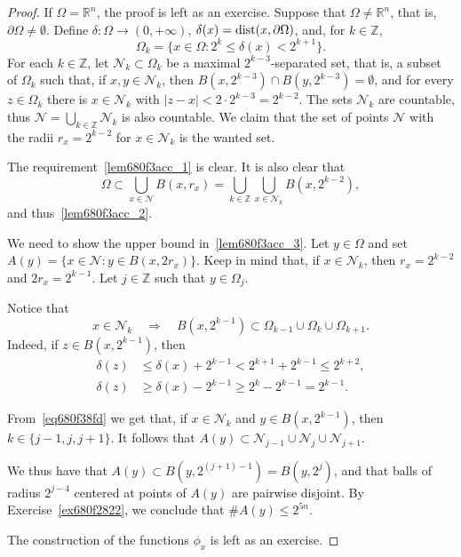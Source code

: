 \documentclass[a4paper,9pt]{amsart}
\newcommand{\scr}[1]{\mathscr{#1}}
\newcommand{\Z}{\mathbb{Z}}	%
\newcommand{\R}{\mathbb{R}}	%
\newcommand{\de}{\partial}		%
\newcommand{\THEN}{\Rightarrow}	%
\theoremstyle{plain}
\theoremstyle{definition}
\theoremstyle{remark}
\begin{document}
\begin{proof}
	If $\Omega=\R^n$, the proof is left as an exercise.
	Suppose that $\Omega\neq\R^n$, that is, $\de\Omega\neq\emptyset$.
	Define $\delta:\Omega\to(0,+\infty)$, $\delta(x) = {\rm dist}(x,\de\Omega)$,
	and, for $k\in\Z$,
	\[
	\Omega_k = \{x\in\Omega: 2^k \le \delta(x) < 2^{k+1}\} .
	\]
	For each $k\in\Z$, let $\scr N_k\subset\Omega_k$ be a maximal $2^{k-3}$-separated set,
	that is, a subset of $\Omega_k$ such that, if $x,y\in\scr N_k$, then $B(x,2^{k-3})\cap B(y,2^{k-3})=\emptyset$, and for every $z\in\Omega_k$ there is $x\in\scr N_k$ with $|z-x|< 2\cdot 2^{k-3} = 2^{k-2}$.
	The sets $\scr N_k$ are countable, thus $\scr N=\bigcup_{k\in\Z}\scr N_k$ is also countable.
	We claim that the set of points $\scr N$ with the radii $r_x = 2^{k-2}$ for $x\in\scr N_k$ is the wanted set.
	
	The requirement~\ref{lem680f3acc_1} is clear.
	It is also clear that
	\begin{equation}
		\Omega 
		\subset\bigcup_{x\in\scr N} B(x,r_x)
		= \bigcup_{k\in\Z} \bigcup_{x\in\scr N_k} B(x,2^{k-2}) ,
	\end{equation}
	and thus~\ref{lem680f3acc_2}.
	
	We need to show the upper bound in~\ref{lem680f3acc_3}.
	Let $y\in\Omega$ and set
	$A(y) = \{x\in\scr N: y\in B(x,2r_x)\}$.
	Keep in mind that, if $x\in\scr N_k$, then $r_x=2^{k-2}$ and $2r_x = 2^{k-1}$.
	Let $j\in\Z$ such that $y\in\Omega_j$.
	
	Notice that
	\begin{equation}\label{eq680f38fd}
		x\in\scr N_k 
		\quad\THEN\quad
		B(x,2^{k-1}) \subset \Omega_{k-1} \cup \Omega_k \cup \Omega_{k+1} .
	\end{equation}
	Indeed, if $z\in B(x,2^{k-1})$, then
	\begin{align*}
	 	\delta(z) &\le \delta(x) + 2^{k-1} < 2^{k+1} + 2^{k-1} \le 2^{k+2} , \\
		\delta(z) &\ge \delta(x) - 2^{k-1} \ge 2^k - 2^{k-1} = 2^{k-1} .
	\end{align*}
	
	From~\eqref{eq680f38fd} we get that, if $x\in\scr N_k$ and $y\in B(x,2^{k-1})$, then $k\in\{j-1,j,j+1\}$.
	It follows that $A(y) \subset \scr N_{j-1}\cup\scr N_j \cup\scr N_{j+1}$.
	
	We thus have that $A(y)\subset B(y,2^{(j+1)-1}) = B(y,2^j)$, 
	and that balls of radius $2^{j-4}$ centered at points of $A(y)$ are pairwise disjoint.
	By Exercise~\ref{ex680f2822}, we conclude that $\#A(y) \le 2^{5n}$.
	
	The construction of the functions $\phi_x$ is left as an exercise.
\end{proof}
\end{document}
